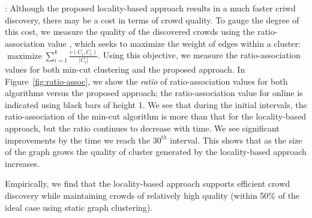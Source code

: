 \documentclass{sig-alternate}
\begin{document}
\medskip{}: Although the proposed locality-based approach results in a much faster criwd discovery, there may be a cost in terms of crowd
quality. To gauge the degree of this cost, we measure the quality of the
discovered crowds using the ratio-association value \cite{dhillon:multilevel},
which seeks to maximize the weight of edges within a cluster:
$\operatorname*{maximize} \sum_{i = 1}^k \frac{c(C_i, C_i)}{|C_i|}$. Using this
objective, we measure the ratio-association values for both min-cut clustering
and the proposed approach. In Figure~\ref{fig:ratio-assoc}, we show the
\textit{ratio} of ratio-association values for both algorithms versus the
proposed approach; the ratio-association value for online is indicated using
black bars of height 1. We see that during the initial intervals, the
ratio-association of the min-cut algorithm is more than that for the locality-based approach, but the
ratio continues to decrease with time. We see significant improvements by the
time we reach the $30^{th}$ interval. This shows that as the size of the graph
grows the quality of cluster generated by the locality-based approach increases. 

Empirically, we find that the locality-based approach supports efficient crowd discovery
while maintaining crowds of relatively high quality (within 50\% of the ideal
case using static graph clustering).


\end{document}
